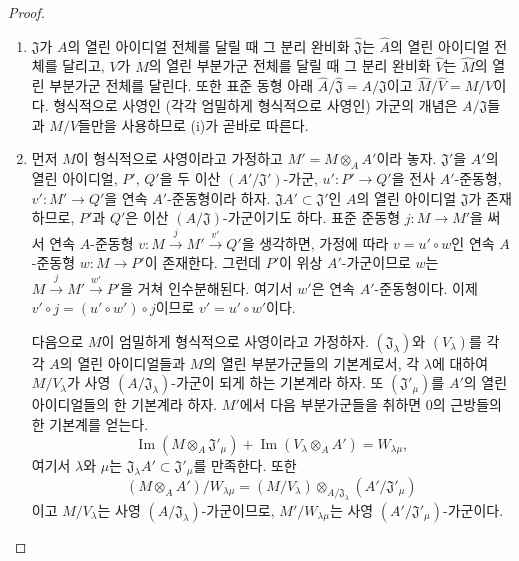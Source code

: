 \begin{proof}
\begin{enumerate}
  \item[(i)] $\mathfrak J$가 $A$의 열린 아이디얼 전체를 달릴 때
  그 분리 완비화 $\widehat{\mathfrak J}$는 $\widehat A$의 열린
  아이디얼 전체를 달리고, $V$가 $M$의 열린 부분가군 전체를 달릴 때
  그 분리 완비화 $\widehat V$는 $\widehat M$의 열린 부분가군 전체를
  달린다. 또한 표준 동형 아래
  $\widehat A/\widehat{\mathfrak J}=A/\mathfrak J$이고
  $\widehat M/\widehat V=M/V$이다. 형식적으로 사영인 (각각 엄밀하게
  형식적으로 사영인) 가군의 개념은 $A/\mathfrak J$들과 $M/V$들만을
  사용하므로 (i)가 곧바로 따른다.

  \item[(ii)] 먼저 $M$이 형식적으로 사영이라고 가정하고
  $M'=M\otimes_A A'$이라 놓자. $\mathfrak J'$을 $A'$의 열린
  아이디얼, $P'$, $Q'$을 두 이산 $(A'/\mathfrak J')$-가군,
  $u':P'\to Q'$을 전사 $A'$-준동형, $v':M'\to Q'$을 연속
  $A'$-준동형이라 하자. $\mathfrak JA'\subset\mathfrak J'$인 $A$의
  열린 아이디얼 $\mathfrak J$가 존재하므로, $P'$과 $Q'$은 이산
  $(A/\mathfrak J)$-가군이기도 하다. 표준 준동형 $j:M\to M'$을 써서
  연속 $A$-준동형
  $v:M\xrightarrow{j}M'\xrightarrow{v'}Q'$을 생각하면, 가정에 따라
  $v=u'\circ w$인 연속 $A$-준동형 $w:M\to P'$이 존재한다. 그런데
  $P'$이 위상 $A'$-가군이므로 $w$는
  $M\xrightarrow{j}M'\xrightarrow{w'}P'$을 거쳐 인수분해된다. 여기서
  $w'$은 연속 $A'$-준동형이다. 이제
  $v'\circ j=(u'\circ w')\circ j$이므로 $v'=u'\circ w'$이다.

  다음으로 $M$이 엄밀하게 형식적으로 사영이라고 가정하자.
  $(\mathfrak J_\lambda)$와 $(V_\lambda)$를 각각 $A$의 열린
  아이디얼들과 $M$의 열린 부분가군들의 기본계로서, 각 $\lambda$에
  대하여 $M/V_\lambda$가 사영 $(A/\mathfrak J_\lambda)$-가군이 되게
  하는 기본계라 하자. 또 $(\mathfrak J'_\mu)$를 $A'$의 열린
  아이디얼들의 한 기본계라 하자. $M'$에서 다음 부분가군들을 취하면
  $0$의 근방들의 한 기본계를 얻는다.
  \[
    \operatorname{Im}(M\otimes_A\mathfrak J'_\mu)
    +\operatorname{Im}(V_\lambda\otimes_A A')=W_{\lambda\mu},
  \]
  여기서 $\lambda$와 $\mu$는
  $\mathfrak J_\lambda A'\subset\mathfrak J'_\mu$를 만족한다. 또한
  \[
    (M\otimes_A A')/W_{\lambda\mu}
    =(M/V_\lambda)\otimes_{A/\mathfrak J_\lambda}
      (A'/\mathfrak J'_\mu)
  \]
  이고 $M/V_\lambda$는 사영 $(A/\mathfrak J_\lambda)$-가군이므로,
  $M'/W_{\lambda\mu}$는 사영 $(A'/\mathfrak J'_\mu)$-가군이다.
\end{enumerate}
\end{proof}

